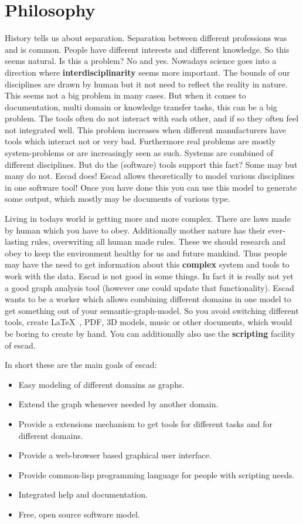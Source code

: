 \documentclass[a4paper, 12pt, openany]{scrbook}
\begin{document}
\section{Philosophy}
History tells us about separation. Separation between different professions was and is common. People have different interests and different knowledge. So this seems natural. Is this a problem? No and yes. Nowadays science goes into a direction where \textbf{interdisciplinarity} seems more important. The bounds of our disciplines are drawn by human but it not need to reflect the reality in nature. This seems not a big problem in many cases. But when it comes to documentation, multi domain or knowledge transfer tasks, this can be a big problem. The tools often do not interact with each other, and if so they often feel not integrated well. This problem increases when different manufacturers have tools which interact not or very bad. Furthermore real problems are mostly system-problems or are increasingly seen as such. Systems are combined of different disciplines. But do the (software) tools support this fact? Some may but many do not. Escad does! Escad allows theoretically to model various disciplines in one software tool! Once you have done this you can use this model to generate some output, which mostly may be documents of various type.

Living in todays world is getting more and more complex. There are laws made by human which you have to obey. Additionally mother nature has their ever-lasting rules, overwriting all human made rules. These we should research and obey to keep the environment healthy for us and future mankind. Thus people may have the need to get information about this \textbf{complex} system and tools to work with the data. Escad is not good in some things. In fact it is really not yet a good graph analysis tool (however one could update that functionality). Escad wants to be a worker which allows combining different domains in one model to get something out of your semantic-graph-model. So you avoid switching different tools, create \LaTeX\ , PDF, 3D models, music or other documents, which would be boring to create by hand. You can additionally also use the \textbf{scripting} facility of escad.

In short these are the main goals of escad:
\begin{itemize}
\item Easy modeling of different domains as graphs.
\item Extend the graph whenever needed by another domain.
\item Provide a extensions mechanism to get tools for different tasks and for different domains.
\item Provide a web-browser based graphical user interface.
\item Provide common-lisp programming language for people with scripting needs.
\item Integrated help and documentation.
\item Free, open source software model.
\end{itemize}
\end{document}

